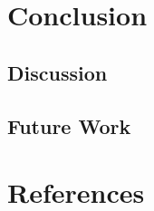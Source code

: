 \section{Conclusion}
\subsection{Discussion}
\subsection{Future Work}



%
%
\section{References}


\renewcommand\refname{\vskip -1cm}

\footnotesize

%
%



